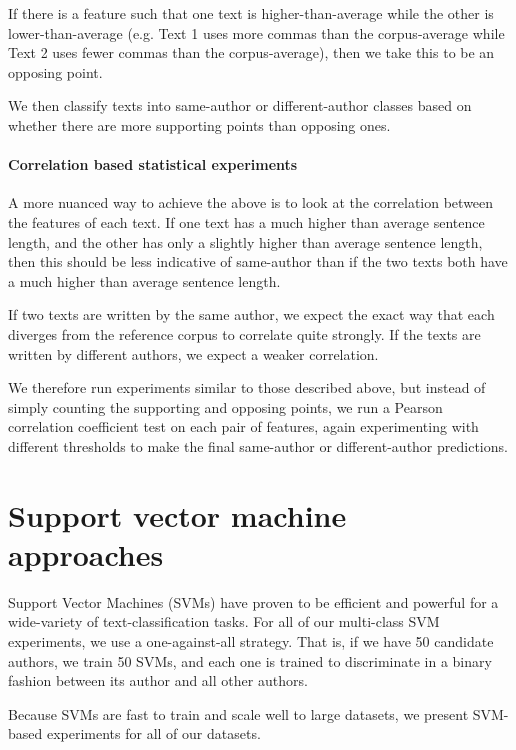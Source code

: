 If there is a feature such that one text is higher-than-average while
the other is lower-than-average (e.g. Text 1 uses more commas than the
corpus-average while Text 2 uses fewer commas than the corpus-average),
then we take this to be an opposing point.

We then classify texts into same-author or different-author classes
based on whether there are more supporting points than opposing ones.

\paragraph{Correlation based statistical
experiments}\label{correlation-based-statistical-experiments}

A more nuanced way to achieve the above 
is to look at the correlation between the features of each text. 
If one text has a much higher than average sentence length,
and the other has only a slightly higher than average sentence length,
then this should be less indicative of same-author than if the two texts
both have a much higher than average sentence length.

If two texts are written by the same author, we expect the exact way that
each diverges from the reference corpus to correlate quite strongly. If
the texts are written by different authors, we expect a weaker
correlation.

We therefore run experiments similar to those described above, but instead 
of simply counting the supporting and opposing points, we run a Pearson correlation 
coefficient test on each pair of features, again experimenting with different thresholds 
to make the final same-author or different-author predictions.

\section{Support vector machine approaches}
\label{method:svm}

Support Vector Machines (SVMs) have proven to be efficient and powerful
for a wide-variety of text-classification tasks. For all of our
multi-class SVM experiments, we use a one-against-all strategy. That is,
if we have 50 candidate authors, we train 50 SVMs, and each one is
trained to discriminate in a binary fashion between its author and all
other authors.

Because SVMs are fast to train and scale well to large datasets, we
present SVM-based experiments for all of our datasets.

